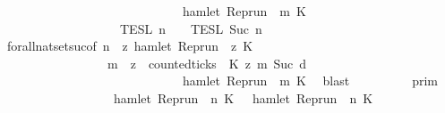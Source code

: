 \begin{isabellebody}
\ \ \ \ \ \ \ \ \ \ \ \ \ \ \ \ \ \ \ \ \ \ \ \ \ \ \ \ {\isasymlongrightarrow}\ hamlet\ {\isacharparenleft}{\isacharparenleft}Rep{\isacharunderscore}run\ {\isasymrho}{\isacharparenright}\ m\ K\ {\isacharbraceright}\isanewline
\ \ \ \ \ \ \ \ \ \ \ \ \ \ \ \ {\isasyminter}\ {\isasymlbrakk}{\isasymlbrakk}\ {\isasymPsi}\ {\isasymrbrakk}{\isasymrbrakk}\isactrlsub T\isactrlsub E\isactrlsub S\isactrlsub L\isactrlbsup {\isasymge}\ n\isactrlesup \ {\isasyminter}\ {\isasymlbrakk}{\isasymlbrakk}\ {\isasymPhi}\ {\isasymrbrakk}{\isasymrbrakk}\isactrlsub T\isactrlsub E\isactrlsub S\isactrlsub L\isactrlbsup {\isasymge}\ Suc\ n\isactrlesup {\isacartoucheclose}\isanewline
\ \ \ \ \isamarkupfalse%
\ forall{\isacharunderscore}nat{\isacharunderscore}set{\isacharunderscore}suc{\isacharbrackleft}of\ {\isacartoucheopen}n{\isacartoucheclose}\ {\isacartoucheopen}{\isasymlambda}{\isasymrho}\ z{\isachardot}\ hamlet\ {\isacharparenleft}{\isacharparenleft}Rep{\isacharunderscore}run\ {\isasymrho}{\isacharparenright}\ z\ K\ {\isasymlongrightarrow}\isanewline
\ \ \ \ \ \ \ \ \ \ \ \ \ \ \ \ \ {\isacharparenleft}{\isasymforall}m\ {\isasymge}\ z{\isachardot}\ \ counted{\isacharunderscore}ticks\ {\isasymrho}\ K\ z\ m\ {\isacharparenleft}Suc\ d{\isacharparenright}\isanewline
\ \ \ \ \ \ \ \ \ \ \ \ \ \ \ \ \ \ \ \ \ \ \ \ \ \ \ \ {\isasymlongrightarrow}\ hamlet\ {\isacharparenleft}{\isacharparenleft}Rep{\isacharunderscore}run\ {\isasymrho}{\isacharparenright}\ m\ K\ \isamarkupfalse%
\ blast\isanewline
\ \ \isamarkupfalse%
\ \isamarkupfalse%
\ {\isacartoucheopen}{\isachardot}{\isachardot}{\isachardot}\ {\isacharequal}\ {\isasymlbrakk}{\isasymlbrakk}\ {\isasymGamma}\ {\isasymrbrakk}{\isasymrbrakk}\isactrlsub p\isactrlsub r\isactrlsub i\isactrlsub m\ \isanewline
\ \ \ \ \ \ \ \ \ \ \ \ \ \ \ \ {\isasyminter}\ {\isacharparenleft}{\isacharbraceleft}{\isasymrho}{\isachardot}\ {\isasymnot}hamlet\ {\isacharparenleft}{\isacharparenleft}Rep{\isacharunderscore}run\ {\isasymrho}{\isacharparenright}\ n\ K\ {\isasymunion}\ {\isacharbraceleft}{\isasymrho}{\isachardot}\ hamlet\ {\isacharparenleft}{\isacharparenleft}Rep{\isacharunderscore}run\ {\isasymrho}{\isacharparenright}\ n\ K\ {\isasymand}\isanewline

\end{isabellebody}
